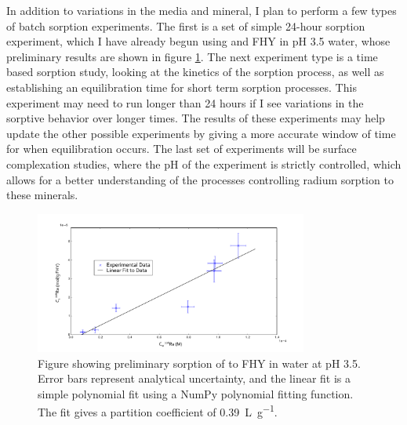 \documentclass[twoside,12pt,titlepage]{article}
\newcommand{\isotope}[2]{\ch{^{#1}#2}}
\begin{document}
\par In addition to variations in the media and mineral, I plan to perform a few types of batch sorption experiments. The first is a set of simple 24-hour sorption experiment, which I have already begun using \isotope{226}{Ra} and FHY in pH \num{3.5} water, whose preliminary results are shown in figure \ref{fig:RaFHYSorb}. The next experiment type is a time based sorption study, looking at the kinetics of the sorption process, as well as establishing an equilibration time for short term sorption processes. This experiment may need to run longer than 24 hours if I see variations in the sorptive behavior over longer times. The results of these experiments may help update the other possible experiments by giving a more accurate window of time for when equilibration occurs. The last set of experiments will be surface complexation studies, where the pH of the experiment is strictly controlled, which allows for a better understanding of the processes controlling radium sorption to these minerals.

\begin{figure}
	\centering
	\includegraphics[width=0.8\textwidth]{AGU2014FHYRa.pdf}
	\caption{Figure showing preliminary sorption of \isotope{226}{Ra} to FHY in water at pH \num{3.5}. Error bars represent analytical uncertainty, and the linear fit is a simple polynomial fit using a NumPy polynomial fitting function. The fit gives a partition coefficient of \SI{0.39}{\liter\per\gram}.}
	\label{fig:RaFHYSorb}
\end{figure}
\end{document}
